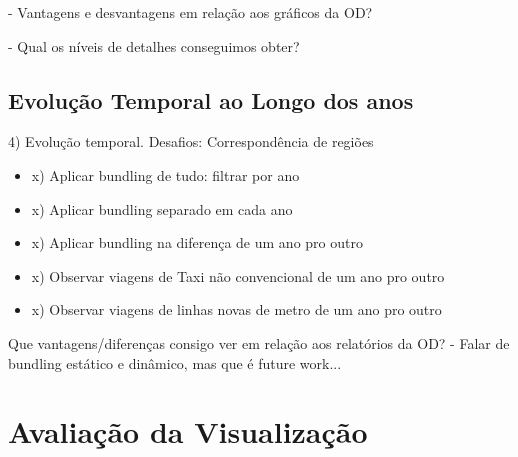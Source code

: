 	- Vantagens e desvantagens em relação aos gráficos da OD?

	- Qual os níveis de detalhes conseguimos obter?


\subsection{Evolução Temporal ao Longo dos anos}

4) Evolução temporal. Desafios: Correspondência de regiões

  \begin{itemize}
    \item x) Aplicar bundling de tudo: filtrar por ano
    \item x) Aplicar bundling separado em cada ano
    \item x) Aplicar bundling na diferença de um ano pro outro
    \item x) Observar viagens de Taxi não convencional de um ano pro outro
    \item x) Observar viagens de linhas novas de metro de um ano pro outro
  \end{itemize}

	Que vantagens/diferenças consigo ver em relação aos relatórios da OD?
	- Falar de bundling estático e dinâmico, mas que é future work...


\section{Avaliação da Visualização} 
